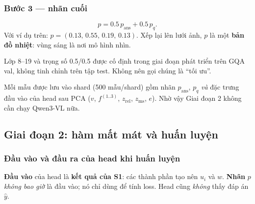 \documentclass[11pt,a4paper]{article}
\begin{document}
\subsubsection*{Bước 3 --- nhãn cuối}
\begin{equation}
p=0.5\,p_\text{ans}+0.5\,p_q.
\end{equation}
Với ví dụ trên: $p=(0.13,\,0.55,\,0.19,\,0.13)$. Xếp lại lên lưới ảnh, $p$ là một \textbf{bản đồ nhiệt}: vùng sáng là nơi mô hình nhìn.

\begin{luuy}
Lớp 8--19 và trọng số 0.5/0.5 được cố định trong giai đoạn phát triển trên GQA val, không tinh chỉnh trên tập test. Không nên gọi chúng là ``tối ưu''.
\end{luuy}

Mỗi mẫu được lưu vào shard (500 mẫu/shard) gồm nhãn $p_\text{ans}$, $p_q$ \emph{và} đặc trưng đầu vào của head sau PCA ($v$, $f^{(1..3)}$, $z_\text{rel}$, $z_\text{ms}$, $e$). Nhờ vậy Giai đoạn 2 không cần chạy Qwen3-VL nữa.

\subsection{Giai đoạn 2: hàm mất mát và huấn luyện}
\label{sec:train}

\subsubsection*{Đầu vào và đầu ra của head khi huấn luyện}
\begin{tcolorbox}[colback=yellow!8,colframe=yellow!50!black]
\textbf{Đầu vào} của head là \textbf{kết quả của S1}: các thành phần tạo nên $u_i$ và $w$. \textbf{Nhãn} $p$ \emph{không bao giờ} là đầu vào; nó chỉ dùng để tính loss. Head cũng \emph{không} thấy đáp án $\hat y$.
\end{tcolorbox}
\end{document}

